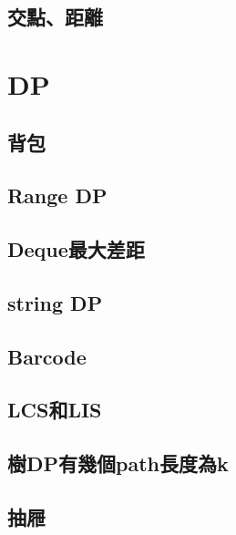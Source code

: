         \subsection{交點、距離}
            
\clearpage

\section{DP}
    \subsection{背包}
         \columnbreak
    \subsection{Range DP}
        
    \subsection{Deque最大差距}
         \columnbreak
    \subsection{string DP}
        
    \subsection{Barcode}
        
    \subsection{LCS和LIS}
         \columnbreak
    \subsection{樹DP有幾個path長度為k}
        
    \subsection{抽屜}
         \columnbreak
